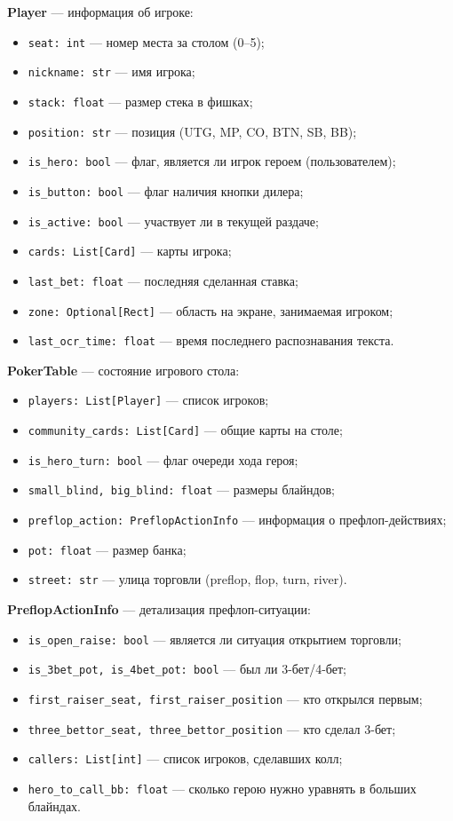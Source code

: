 \textbf{Player} --- информация об игроке:
\begin{itemize}
    \item \texttt{seat: int} --- номер места за столом (0--5);
    \item \texttt{nickname: str} --- имя игрока;
    \item \texttt{stack: float} --- размер стека в фишках;
    \item \texttt{position: str} --- позиция (UTG, MP, CO, BTN, SB, BB);
    \item \texttt{is\_hero: bool} --- флаг, является ли игрок героем (пользователем);
    \item \texttt{is\_button: bool} --- флаг наличия кнопки дилера;
    \item \texttt{is\_active: bool} --- участвует ли в текущей раздаче;
    \item \texttt{cards: List[Card]} --- карты игрока;
    \item \texttt{last\_bet: float} --- последняя сделанная ставка;
    \item \texttt{zone: Optional[Rect]} --- область на экране, занимаемая игроком;
    \item \texttt{last\_ocr\_time: float} --- время последнего распознавания текста.
\end{itemize}

\textbf{PokerTable} --- состояние игрового стола:
\begin{itemize}
    \item \texttt{players: List[Player]} --- список игроков;
    \item \texttt{community\_cards: List[Card]} --- общие карты на столе;
    \item \texttt{is\_hero\_turn: bool} --- флаг очереди хода героя;
    \item \texttt{small\_blind, big\_blind: float} --- размеры блайндов;
    \item \texttt{preflop\_action: PreflopActionInfo} --- информация о префлоп-действиях;
    \item \texttt{pot: float} --- размер банка;
    \item \texttt{street: str} --- улица торговли (preflop, flop, turn, river).
\end{itemize}

\textbf{PreflopActionInfo} --- детализация префлоп-ситуации:
\begin{itemize}
    \item \texttt{is\_open\_raise: bool} --- является ли ситуация открытием торговли;
    \item \texttt{is\_3bet\_pot, is\_4bet\_pot: bool} --- был ли 3-бет/4-бет;
    \item \texttt{first\_raiser\_seat, first\_raiser\_position} --- кто открылся первым;
    \item \texttt{three\_bettor\_seat, three\_bettor\_position} --- кто сделал 3-бет;
    \item \texttt{callers: List[int]} --- список игроков, сделавших колл;
    \item \texttt{hero\_to\_call\_bb: float} --- сколько герою нужно уравнять в больших блайндах.
\end{itemize}

